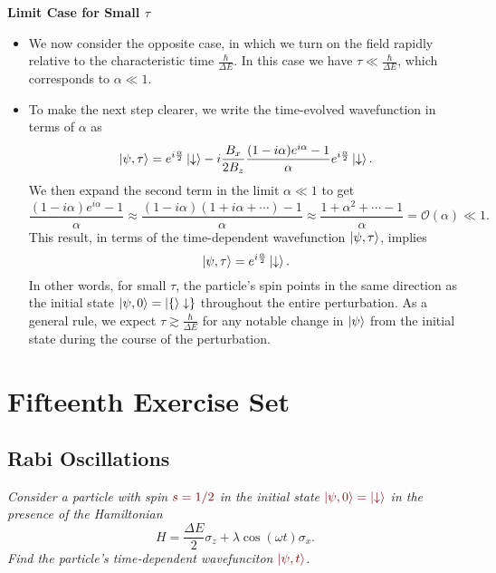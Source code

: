 \documentclass[11pt, a4paper]{article}
\newcommand{\dmath}[1]{\textcolor{Maroon}{#1}}  %
\newcommand{\Ham}{Hamiltonian\xspace}
\newcommand{\p}{\psi}  %
\newcommand{\da}{\downarrow}  %
\begin{document}
\textbf{Limit Case for Small $ \tau $ }
\begin{itemize}

	\item We now consider the opposite case, in which we turn on the field rapidly relative to the characteristic time $ \frac{\hbar}{\Delta E}  $. In this case we have $ \tau \ll \frac{\hbar}{\Delta E} $, which corresponds to $ \alpha \ll 1 $. 

    \item To make the next step clearer, we write the time-evolved wavefunction in terms of $ \alpha $ as 
    \begin{equation*}
        \ket{\p, \tau} = e^{i \frac{\alpha}{2} }\ket{\da} - i \frac{B_{x}}{2B_{z}} \frac{(1 - i \alpha)e^{i\alpha} - 1}{\alpha} e^{i \frac{\alpha}{2} }\ket{\da}.
    \end{equation*}
    We then expand the second term in the limit $ \alpha \ll 1 $ to get
	\begin{equation*}
		\frac{(1 - i\alpha)e^{i\alpha} - 1}{\alpha} \approx \frac{(1 - i \alpha)(1 + i \alpha + \cdots) - 1}{\alpha} \approx \frac{1 + \alpha^{2} + \cdots - 1}{\alpha} = \mathcal{O}(\alpha) \ll 1.
	\end{equation*}
    This result, in terms of the time-dependent wavefunction $ \ket{\p, \tau} $, implies
	\begin{equation*}
		\ket{\p, \tau} = e^{i\frac{\alpha}{2}}\ket{\da}.
	\end{equation*}
    In other words, for small $ \tau $, the particle's spin points in the same direction as the initial state $ \ket{\p, 0} = \ket\{\da\} $ throughout the entire perturbation. As a general rule, we expect $ \tau \gtrsim \frac{\hbar}{\Delta E} $ for any notable change in $ \ket{\p} $ from the initial state during the course of the perturbation.
\end{itemize}

\section{Fifteenth Exercise Set}

\subsection{Rabi Oscillations} 
\textit{Consider a particle with spin $ \dmath{s = 1/2} $ in the initial state $ \dmath{\ket{\p, 0} = \ket{\da}} $ in the presence of the \Ham}
\begin{equation*}
    H = \frac{\Delta E}{2}\sigma_{z} + \lambda \cos (\omega t )\sigma_{x}.
\end{equation*}
\textit{Find the particle's time-dependent wavefunciton $ \dmath{\ket{\p, t}} $.}
\end{document}
